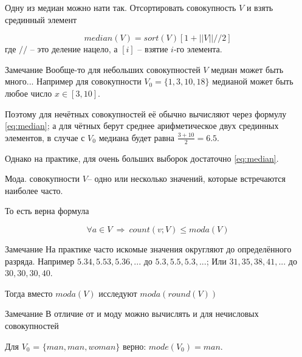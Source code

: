 \begin{frame}
	\small
	Одну из медиан можно нати так. Отсортировать совокупность $V$ и взять срединный элемент

	
	\begin{equation}\label{eq:median}
	median(V) = sort(V)\left[1+||V|| // 2 \right]
	\end{equation}
	где $//$ -- это деление нацело, а $[i]$ -- взятие $i$-го элемента.
	
	\begin{block}{Замечание}
		Вообще-то для небольших совокупностей $V$ медиан может быть много... 
		Например для совокупности $V_0=\{1,3,10,18\}$ медианой может быть любое число $x \in [3,10]$.
		
		Поэтому для нечётных совокупностей её обычно вычисляют через формулу \eqref{eq:median};
		а для чётных берут среднее арифметическое двух срединных элементов,
		в случае с $V_0$ медиана будет равна $\frac{3+10}{2}=6.5$.
		
		Однако на практике, для очень больших выборок достаточно \eqref{eq:median}.
	\end{block}
\end{frame}


\begin{frame}{Мода.}
	\footnotesize
	 совокупности $V$-- одно или несколько значений, которые встречаются наиболее часто.
	
	То есть верна формула
	
	\begin{equation}\label{eq:moda}
	\forall a \in V ~\Longrightarrow~ count(v;V) \leqslant moda(V)
	\end{equation}
	
	\begin{block}{Замечание}
		На практике часто искомые значения округляют до определённого разряда.
		Например $5.34, 5.53, 5.36, ...$ до  $5.3, 5.5, 5.3, ...$;
		Или $31, 35, 38, 41, ...$ до $30, 30, 30, 40$. 
		
		Тогда вместо $moda(V)$ исследуют $moda(round(V))$
	\end{block}
	
	\begin{block}{Замечание}
	В отличие от  и 
	моду можно вычислять и для нечисловых совокупностей
	
	Для $V_0$ = $\{man, man, woman\}$ верно: 
	$mode (V_0) = man$.
	\end{block}
\end{frame}

